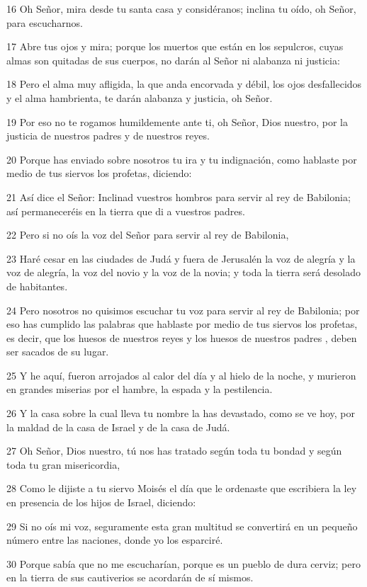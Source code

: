 \par 16 Oh Señor, mira desde tu santa casa y considéranos; inclina tu oído, oh Señor, para escucharnos.
\par 17 Abre tus ojos y mira; porque los muertos que están en los sepulcros, cuyas almas son quitadas de sus cuerpos, no darán al Señor ni alabanza ni justicia:
\par 18 Pero el alma muy afligida, la que anda encorvada y débil, los ojos desfallecidos y el alma hambrienta, te darán alabanza y justicia, oh Señor.
\par 19 Por eso no te rogamos humildemente ante ti, oh Señor, Dios nuestro, por la justicia de nuestros padres y de nuestros reyes.
\par 20 Porque has enviado sobre nosotros tu ira y tu indignación, como hablaste por medio de tus siervos los profetas, diciendo:
\par 21 Así dice el Señor: Inclinad vuestros hombros para servir al rey de Babilonia; así permaneceréis en la tierra que di a vuestros padres.
\par 22 Pero si no oís la voz del Señor para servir al rey de Babilonia,
\par 23 Haré cesar en las ciudades de Judá y fuera de Jerusalén la voz de alegría y la voz de alegría, la voz del novio y la voz de la novia; y toda la tierra será desolado de habitantes.
\par 24 Pero nosotros no quisimos escuchar tu voz para servir al rey de Babilonia; por eso has cumplido las palabras que hablaste por medio de tus siervos los profetas, es decir, que los huesos de nuestros reyes y los huesos de nuestros padres , deben ser sacados de su lugar.
\par 25 Y he aquí, fueron arrojados al calor del día y al hielo de la noche, y murieron en grandes miserias por el hambre, la espada y la pestilencia.
\par 26 Y la casa sobre la cual lleva tu nombre la has devastado, como se ve hoy, por la maldad de la casa de Israel y de la casa de Judá.
\par 27 Oh Señor, Dios nuestro, tú nos has tratado según toda tu bondad y según toda tu gran misericordia,
\par 28 Como le dijiste a tu siervo Moisés el día que le ordenaste que escribiera la ley en presencia de los hijos de Israel, diciendo:
\par 29 Si no oís mi voz, seguramente esta gran multitud se convertirá en un pequeño número entre las naciones, donde yo los esparciré.
\par 30 Porque sabía que no me escucharían, porque es un pueblo de dura cerviz; pero en la tierra de sus cautiverios se acordarán de sí mismos.
